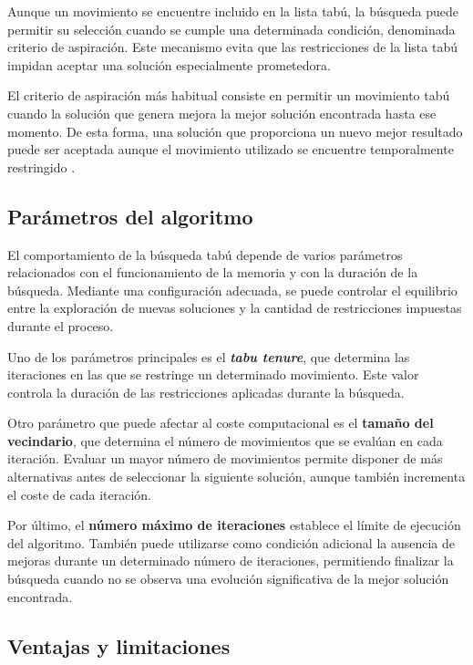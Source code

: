 Aunque un movimiento se encuentre incluido en la lista tabú, la búsqueda puede permitir su selección cuando se cumple una 
determinada condición, denominada criterio de aspiración. Este mecanismo evita que las restricciones de la lista tabú
impidan aceptar una solución especialmente prometedora.

El criterio de aspiración más habitual consiste en permitir un movimiento tabú cuando la solución que genera mejora la
mejor solución encontrada hasta ese momento. De esta forma, una solución que proporciona un nuevo mejor resultado puede ser
aceptada aunque el movimiento utilizado se encuentre temporalmente restringido \cite{basu2012}.

\subsection{Parámetros del algoritmo}
\label{subsec:ts_params}

El comportamiento de la búsqueda tabú depende de varios parámetros relacionados con el funcionamiento de la memoria y con
la duración de la búsqueda. Mediante una configuración adecuada, se puede controlar el equilibrio entre la exploración de
nuevas soluciones y la cantidad de restricciones impuestas durante el proceso.

Uno de los parámetros principales es el \textbf{\textit{tabu tenure}}, que determina las iteraciones en las que se restringe
un determinado  movimiento. Este valor controla la duración de las restricciones aplicadas durante la búsqueda.

Otro parámetro que puede afectar al coste computacional es el \textbf{tamaño del vecindario}, que determina el número de
movimientos que se evalúan en cada iteración. Evaluar un mayor número de movimientos permite disponer de más alternativas
antes de seleccionar la siguiente solución, aunque también incrementa el coste de cada iteración.

Por último, el \textbf{número máximo de iteraciones} establece el límite de ejecución del algoritmo. También puede utilizarse
como condición adicional la ausencia de mejoras durante un determinado número de iteraciones, permitiendo finalizar la
búsqueda cuando no se observa una evolución significativa de la mejor solución encontrada.

\subsection{Ventajas y limitaciones}
\label{subsec:ts_proscons}

